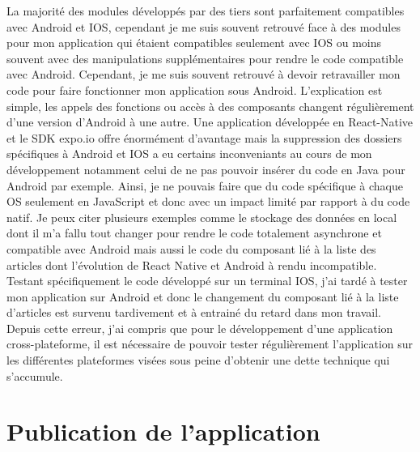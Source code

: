 La majorité des modules développés par des tiers sont parfaitement compatibles avec Android et IOS, cependant je me suis souvent retrouvé face à des modules pour mon application qui étaient compatibles seulement avec IOS ou moins souvent avec des manipulations supplémentaires pour rendre le code compatible avec Android. Cependant, je me suis souvent retrouvé à devoir retravailler mon code pour faire fonctionner mon application sous Android. L’explication est simple, les appels des fonctions ou accès à des composants changent régulièrement d’une version d’Android à une autre. Une application développée en React-Native et le SDK expo.io offre énormément d’avantage mais la suppression des dossiers spécifiques à Android et IOS a eu certains inconveniants au cours de mon développement notamment celui de ne pas pouvoir insérer du code en Java pour Android par exemple. Ainsi, je ne pouvais faire que du code spécifique à chaque OS seulement en JavaScript et donc avec un impact limité par rapport à du code natif.  Je peux citer plusieurs exemples comme le stockage des données en local dont il m'a fallu tout changer pour rendre le code totalement asynchrone et compatible avec Android mais aussi le code du composant lié à la liste des articles dont l’évolution de React Native et Android à rendu incompatible. Testant spécifiquement le code développé sur un terminal IOS, j’ai tardé à tester mon application sur Android et donc le changement du composant lié à la liste d’articles est survenu tardivement et à entrainé du retard dans mon travail. Depuis cette erreur, j’ai compris que pour le développement d’une application cross-plateforme, il est nécessaire de pouvoir tester régulièrement l’application sur les différentes plateformes visées sous peine d’obtenir une dette technique qui s’accumule.  

\section{Publication de l'application}


